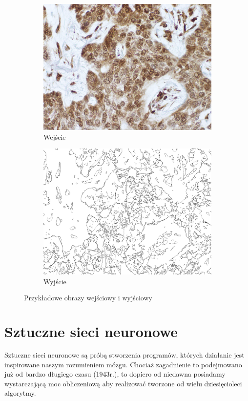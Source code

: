 \documentclass{article}
\begin{document}
\begin{figure}[H]
    \centering
    \begin{subfigure}{0.4\linewidth}
        \includegraphics[width=\linewidth]{images/input.png}
        \caption{Wejście}
    \end{subfigure}
    \begin{subfigure}{0.4\linewidth}
        \includegraphics[width=\linewidth]{images/output.jpg}
        \caption{Wyjście}
    \end{subfigure}
    \caption{Przykładowe obrazy wejściowy i wyjściowy}
    \label{fig:input_and_output}
\end{figure}
\newpage
\section{Sztuczne sieci neuronowe}
Sztuczne sieci neuronowe są próbą stworzenia programów, których działanie jest inspirowane naszym rozumieniem mózgu.
Chociaż zagadnienie to podejmowano już od bardzo długiego czasu (1943r.), to dopiero od niedawna posiadamy wystarczającą moc obliczeniową aby realizować tworzone od wielu dziesięcioleci algorytmy.
\end{document}
